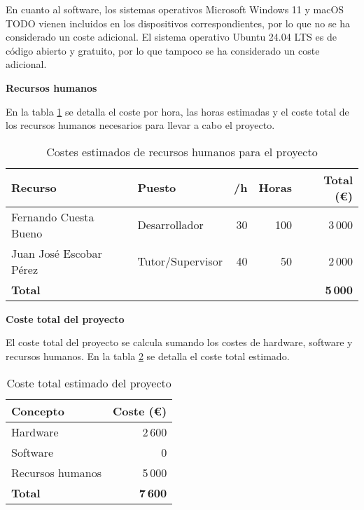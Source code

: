 En cuanto al software, los sistemas operativos Microsoft Windows 11 y macOS {TODO} vienen incluidos en los dispositivos correspondientes, por lo que no se ha considerado un coste adicional. El sistema operativo Ubuntu 24.04 LTS es de código abierto y gratuito, por lo que tampoco se ha considerado un coste adicional.

\textbf{Recursos humanos}

En la tabla \ref{tab:recursos-humanos} se detalla el coste por hora, las horas estimadas y el coste total de los recursos humanos necesarios para llevar a cabo el proyecto.

\begin{table}[!ht]
    \centering
    \begin{tabular}{|l|l|r|r|r|}
        \hline
        \textbf{Recurso}        & \textbf{Puesto}  & \textbf{/h} & \textbf{Horas} & \textbf{Total (€)} \\
        \hline
        Fernando Cuesta Bueno   & Desarrollador    & 30          & 100            & 3\,000             \\
        Juan José Escobar Pérez & Tutor/Supervisor & 40          & 50             & 2\,000             \\
        \hline
        \textbf{Total}          &                  &             &                & \textbf{5\,000}    \\
        \hline
    \end{tabular}
    \caption{Costes estimados de recursos humanos para el proyecto}
    \label{tab:recursos-humanos}
\end{table}

\textbf{Coste total del proyecto}

El coste total del proyecto se calcula sumando los costes de hardware, software y recursos humanos. En la tabla \ref{tab:coste-total} se detalla el coste total estimado.

\begin{table}[!ht]
    \centering
    \begin{tabular}{|l|r|}
        \hline
        \textbf{Concepto} & \textbf{Coste (€)} \\
        \hline
        Hardware          & 2\,600             \\
        Software          & 0                  \\
        Recursos humanos  & 5\,000             \\
        \hline
        \textbf{Total}    & \textbf{7\,600}    \\
        \hline
    \end{tabular}
    \caption{Coste total estimado del proyecto}
    \label{tab:coste-total}
\end{table}